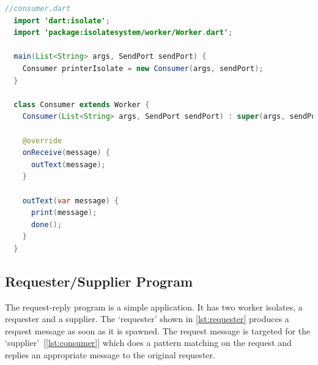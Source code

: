 \begin{lstlisting}[language=java, firstnumber=1, caption=Basic version of Consumer Worker of Producer-Consumer application, label=lst:consumer]
  //consumer.dart
  import 'dart:isolate';
  import 'package:isolatesystem/worker/Worker.dart';

  main(List<String> args, SendPort sendPort) {
    Consumer printerIsolate = new Consumer(args, sendPort);
  }

  class Consumer extends Worker {
    Consumer(List<String> args, SendPort sendPort) : super(args, sendPort);

    @override
    onReceive(message) {
      outText(message);
    }

    outText(var message) {
      print(message);
      done();
    }
  }

\end{lstlisting}

\subsection{Requester/Supplier Program}
\label{sec:request-reply-program}
The request-reply program is a simple application. It has two worker isolates, a requester and a supplier. The ‘requester’ shown in \autoref{lst:requester} produces a request message as soon as it is spawned. The request message is targeted for the ‘supplier’~[\autoref{lst:consumer}] which does a pattern matching on the request and replies an appropriate message to the original requester.

